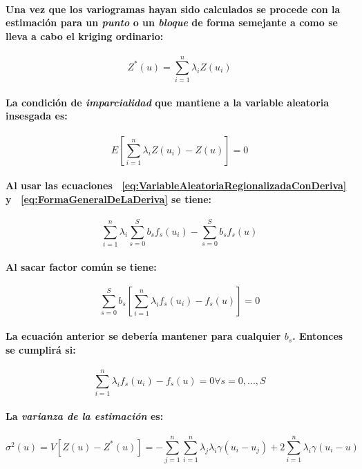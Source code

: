 \paragraph{
Una vez que los variogramas hayan sido calculados se procede con la estimación para un \emph{punto} o un \emph{bloque} de forma semejante a como se lleva a cabo el kriging ordinario:
}
\begin{equation}
Z^*(u) = \sum_{i=1}^n \lambda_i Z(u_i)
\end{equation}
\paragraph{
La condición de \emph{imparcialidad} que mantiene a la variable aleatoria insesgada es:
}
\begin{equation}
E\left[\sum_{i=1}^n \lambda_i Z(u_i) - Z(u)\right]=0
\end{equation}
\paragraph{
Al usar las ecuaciones ~\ref{eq:VariableAleatoriaRegionalizadaConDeriva} y ~\ref{eq:FormaGeneralDeLaDeriva} se tiene:
}
\begin{equation}
\sum_{i=1}^n \lambda_i \sum_{s=0}^S b_s f_s(u_i) - \sum_{s=0}^S b_s f_s(u)
\end{equation}
\paragraph{
Al sacar factor común se tiene:
}
\begin{equation}
\sum_{s=0}^S b_s \left[ \sum_{i=1}^n \lambda_i f_s(u_i) - f_s(u) \right] = 0
\end{equation}
\paragraph{
La ecuación anterior se debería mantener para cualquier $b_s$. Entonces se cumplirá si:
}
\begin{equation}
\sum_{i=1}^n \lambda_i f_s(u_i) - f_s(u) = 0 \forall s = 0,...,S
\end{equation}
\paragraph{
La \emph{varianza de la estimación} es:
}
\begin{equation}
\sigma^2(u) = V[Z(u) - Z^*(u)] = - \sum_{j=1}^n \sum_{i=1}^n \lambda_j \lambda_i \gamma(u_i - u_j) + 2 \sum_{i=1}^n \lambda_i \gamma(u_i -u)
\end{equation}
